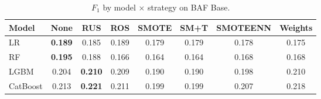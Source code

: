 \begin{table}[ht]
\centering
\caption{$F_1$ by model $\times$ strategy on BAF Base.}
\label{tab:factorial_baf_f1}
\begin{tabular}{l c c c c c c c}
\toprule
Model & None & RUS & ROS & SMOTE & SM+T & SMOTEENN & Weights \\
\midrule
LR         & \textbf{0.189} & 0.185 & 0.189 & 0.179 & 0.179 & 0.178 & 0.175 \\
RF         & \textbf{0.195} & 0.188 & 0.166 & 0.164 & 0.164 & 0.168 & 0.168 \\
LGBM       & 0.204 & \textbf{0.210} & 0.209 & 0.190 & 0.190 & 0.198 & 0.210 \\
CatBoost   & 0.213 & \textbf{0.221} & 0.211 & 0.199 & 0.199 & 0.207 & 0.218 \\
\bottomrule
\end{tabular}
\end{table}